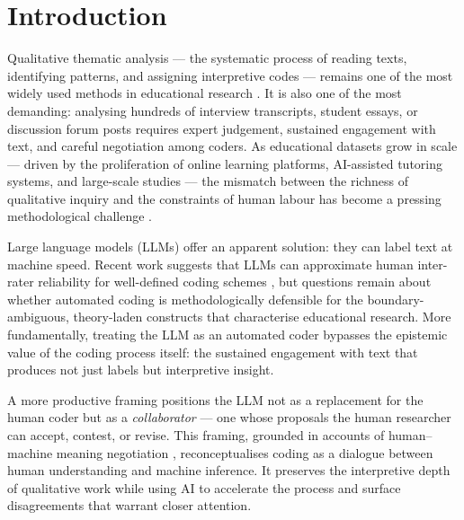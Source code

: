 \documentclass[fleqn,10pt]{JLA_article}
\affiliation{\textsuperscript{1}\textit{[Department, University, City, Country. email: author@university.edu}}
\affiliation{\textsuperscript{2}\textit{[Department, University, City, Country. email: author2@university.edu}}
\begin{document}
\flushbottom
\maketitle
\thispagestyle{fancy}

\section{Introduction}

Qualitative thematic analysis — the systematic process of reading texts, identifying
patterns, and assigning interpretive codes — remains one of the most widely used
methods in educational research \cite{braun2006using}. It is also one of the most
demanding: analysing hundreds of interview transcripts, student essays, or discussion
forum posts requires expert judgement, sustained engagement with text, and careful
negotiation among coders. As educational datasets grow in scale — driven by the
proliferation of online learning platforms, AI-assisted tutoring systems, and
large-scale studies — the mismatch between the richness of qualitative inquiry
and the constraints of human labour has become a pressing methodological challenge
\cite{papamitsiou2014learning}.

Large language models (LLMs) offer an apparent solution: they can label text at
machine speed. Recent work suggests that LLMs can approximate human inter-rater
reliability for well-defined coding schemes \cite{bing2024llm}, but questions
remain about whether automated coding is methodologically defensible for the
boundary-ambiguous, theory-laden constructs that characterise educational research.
More fundamentally, treating the LLM as an automated coder bypasses the epistemic
value of the coding process itself: the sustained engagement with text that produces
not just labels but interpretive insight.

A more productive framing positions the LLM not as a replacement for the human coder
but as a \emph{collaborator} — one whose proposals the human researcher can accept,
contest, or revise. This framing, grounded in accounts of human--machine meaning
negotiation \cite{liu2026meaning}, reconceptualises coding as a dialogue between human
understanding and machine inference. It preserves the interpretive depth of qualitative
work while using AI to accelerate the process and surface disagreements that warrant
closer attention.
\end{document}
